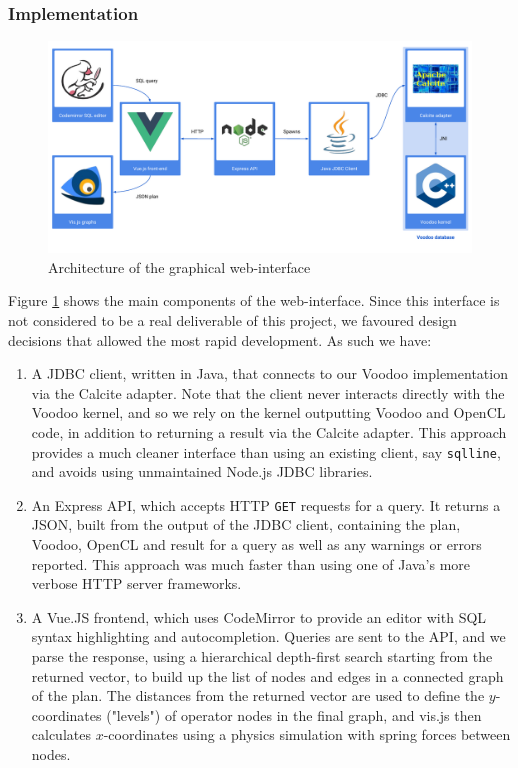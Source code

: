 \subsubsection{Implementation}

\begin{figure}
\includegraphics[width=\textwidth]{design-and-implementation/web-interface.pdf}
\centering
\caption{Architecture of the graphical web-interface}
\label{fig:web-interface}
\end{figure}

Figure \ref{fig:web-interface} shows the main components of the web-interface. Since this interface is not considered to be a real deliverable of this project, we favoured design decisions that allowed the most rapid development. As such we have:

\begin{enumerate}
\item A JDBC client, written in Java, that connects to our Voodoo implementation via the Calcite adapter. Note that the client never interacts directly with the Voodoo kernel, and so we rely on the kernel outputting Voodoo and OpenCL code, in addition to returning a result via the Calcite adapter. This approach provides a much cleaner interface than using an existing client, say \texttt{sqlline}, and avoids using unmaintained Node.js JDBC libraries.
\item An Express API, which accepts HTTP \texttt{GET} requests for a query. It returns a JSON, built from the output of the JDBC client, containing the plan, Voodoo, OpenCL and result for a query as well as any warnings or errors reported. This approach was much faster than using one of Java's more verbose HTTP server frameworks.
\item A Vue.JS frontend, which uses CodeMirror to provide an editor with SQL syntax highlighting and autocompletion. Queries are sent to the API, and we parse the response, using a hierarchical depth-first search starting from the returned vector, to build up the list of nodes and edges in a connected graph of the plan. The distances from the returned vector are used to define the $y$-coordinates ("levels") of operator nodes in the final graph, and vis.js then calculates $x$-coordinates using a physics simulation with spring forces between nodes.
\end{enumerate}


